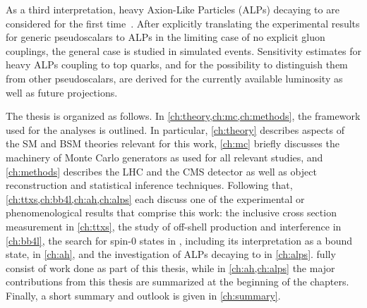 As a third interpretation, heavy Axion-Like Particles (ALPs) decaying to \ttbar are considered for the first time~\cite{Jeppe:2024sxt}. After explicitly translating the experimental results for generic pseudoscalars to ALPs in the limiting case of no explicit gluon couplings, the general case is studied in simulated events. Sensitivity estimates for heavy ALPs coupling to top quarks, and for the possibility to distinguish them from other pseudoscalars, are derived for the currently available luminosity as well as future projections.

\medskip

The thesis is organized as follows. In \cref{ch:theory,ch:mc,ch:methods}, the framework used for the analyses is outlined. In particular, \cref{ch:theory} describes aspects of the SM and BSM theories relevant for this work, \cref{ch:mc} briefly discusses the machinery of Monte Carlo generators as used for all relevant studies, and \cref{ch:methods} describes the LHC and the CMS detector as well as object reconstruction and statistical inference techniques. Following that, \cref{ch:ttxs,ch:bb4l,ch:ah,ch:alps} each discuss one of the experimental or phenomenological results that comprise this work: the inclusive \ttbar cross section measurement in \cref{ch:ttxs}, the study of off-shell \ttbar production and \tttW interference in \cref{ch:bb4l}, the search for spin-0 states in \ttbar, including its interpretation as a \ttbar bound state, in \cref{ch:ah}, and the investigation of ALPs decaying to \ttbar in \cref{ch:alps}.  fully consist of work done as part of this thesis, while in \cref{ch:ah,ch:alps} the major contributions from this thesis are summarized at the beginning of the chapters. Finally, a short summary and outlook is given in \cref{ch:summary}.




